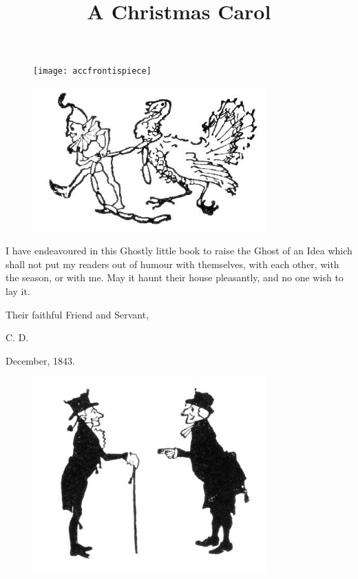 \documentclass[paper=a5,BCOR=15mm,twoside,DIV=15,headinclude=off,12pt,chapterprefix=off,openany,headings=huge]{scrbook} %
\begin{document}
\renewcommand*{\sectionmarkformat}{}
\renewcommand*\raggedchapter{\centering}
\pagestyle{empty}
\begin{figure}[p]
\begin{minipage}[c]{\linewidth}
\texttt{[image: accfrontispiece]}
\end{minipage}
\end{figure}
\title{A Christmas Carol}



\renewcommand*{\chapterpagestyle}{empty}
\tableofcontents
\begin{figure}
\centering
\includegraphics[width=0.8\textwidth]{gs011}
\end{figure}
\clearpage
\pagestyle{headings}
\renewcommand*{\chapterpagestyle}{plain}

\lettrine[loversize=.85]{I}{} have endeavoured in this Ghostly little book to raise the Ghost of an Idea which shall not put my readers out of humour with themselves, with each other, with the season, or with me. May it haunt their house pleasantly, and no one wish to lay it.

Their faithful Friend and Servant,

C. D.

December, 1843.
\begin{figure}[h]
\centering
\includegraphics[width=0.8\textwidth]{gs007}
\end{figure}
\end{document}
